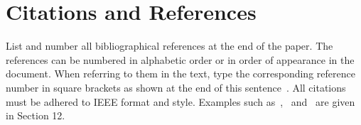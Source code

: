 \documentclass{article}
\begin{document}




\section{Citations and References}

List and number all bibliographical references at the end of the paper. The references can be numbered in alphabetic order or in order of appearance in the document. When referring to them in the text, type the corresponding reference number in square brackets as shown at the end of this sentence~\cite{Morgan2005}. All citations must be adhered to IEEE format and style. Examples such as~\cite{Morgan2005},~\cite{cooley65} and~\cite{kurose} are given in Section 12.



\end{document}
